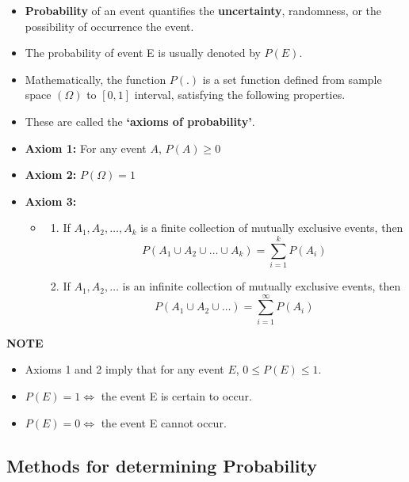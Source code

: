 \documentclass[]{book}
\providecommand{\tightlist}{%
  \setlength{\itemsep}{0pt}\setlength{\parskip}{0pt}}
\begin{document}
\begin{itemize}
\item
  \textbf{Probability} of an event quantifies the \textbf{uncertainty}, randomness, or the possibility of occurrence the event.
\item
  The probability of event E is usually denoted by \(P(E)\).
\item
  Mathematically, the function \(P(.)\) is a set function defined from sample space \((\Omega)\) to \([0, 1]\) interval, satisfying the following properties.
\item
  These are called the \textbf{`axioms of probability'}.
\item
  \textbf{Axiom 1:} For any event \(A\), \(P(A) \geq 0\)
\item
  \textbf{Axiom 2:} \(P(\Omega) = 1\)
\item
  \textbf{Axiom 3:}

  \begin{itemize}
  \item
    \begin{enumerate}
    \def\labelenumi{(\alph{enumi})}
    \tightlist
    \item
      If \(A_1, A_2, \dots, A_k\) is a finite collection of mutually exclusive events, then \[P(A_1\cup A_2\cup \dots \cup A_k)= \sum_{i=1}^kP(A_i)\]
    \item
      If \(A_1, A_2, \dots\) is an infinite collection of mutually exclusive events, then
      \[P(A_1\cup A_2\cup \dots)= \sum_{i=1}^\infty P(A_i)\]
    \end{enumerate}
  \end{itemize}
\end{itemize}

\textbf{NOTE}

\begin{itemize}
\tightlist
\item
  Axioms 1 and 2 imply that for any event \(E\), \(0 \leq P (E) \leq 1\).
\item
  \(P (E) = 1 \iff\) the event E is certain to occur.
\item
  \(P (E) = 0 \iff\) the event E cannot occur.
\end{itemize}

\hypertarget{methods-for-determining-probability}{%
\subsection*{Methods for determining Probability}\label{methods-for-determining-probability}}
\end{document}
